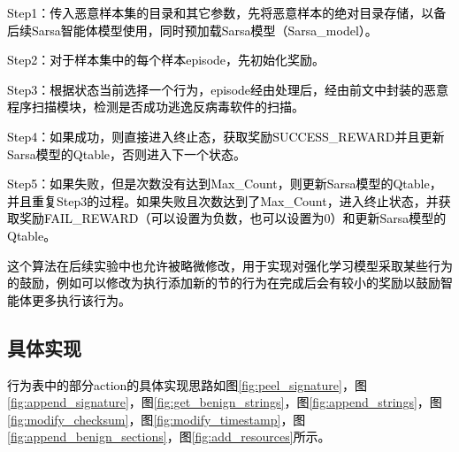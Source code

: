 \textcolor{black}{Step1：传入恶意样本集的目录和其它参数，先将恶意样本的绝对目录存储，以备后续Sarsa智能体模型使用，同时预加载Sarsa模型（Sarsa\_model）。}

\textcolor{black}{Step2：对于样本集中的每个样本episode，先初始化奖励。}

\textcolor{black}{Step3：根据状态当前选择一个行为，episode经由处理后，经由前文中封装的恶意程序扫描模块，检测是否成功逃逸反病毒软件的扫描。}

\textcolor{black}{Step4：如果成功，则直接进入终止态，获取奖励SUCCESS\_REWARD并且更新Sarsa模型的Qtable，否则进入下一个状态。}

\textcolor{black}{Step5：如果失败，但是次数没有达到Max\_Count，则更新Sarsa模型的Qtable，并且重复Step3的过程。如果失败且次数达到了Max\_Count，进入终止状态，并获取奖励FAIL\_REWARD（可以设置为负数，也可以设置为0）和更新Sarsa模型的Qtable。}

\textcolor{black}{这个算法在后续实验中也允许被略微修改，用于实现对强化学习模型采取某些行为的鼓励，例如可以修改为执行添加新的节的行为在完成后会有较小的奖励以鼓励智能体更多执行该行为。}

\subsection{具体实现}

\textcolor{black}{行为表中的部分action的具体实现思路如图\ref{fig:peel_signature}，图\ref{fig:append_signature}，图\ref{fig:get_benign_strings}，图\ref{fig:append_strings}，图\ref{fig:modify_checksum}，图\ref{fig:modify_timestamp}，图\ref{fig:append_benign_sections}，图\ref{fig:add_resources}所示。}

